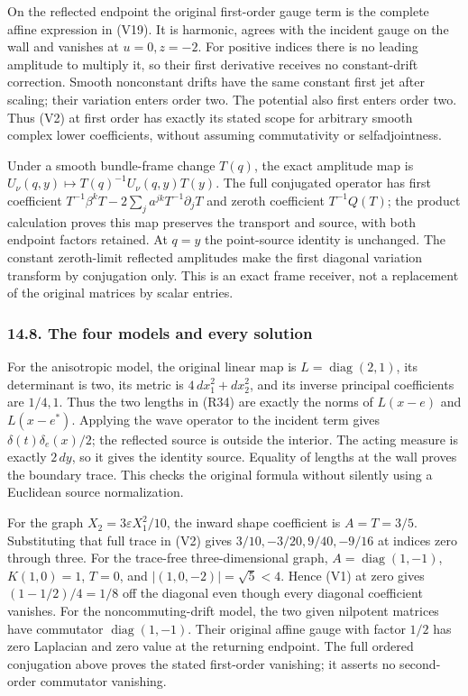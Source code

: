 \documentclass[
  11pt,
]{article}
\begin{document}
On the reflected endpoint the original first-order gauge term is the
complete affine expression in (V19). It is harmonic, agrees with the
incident gauge on the wall and vanishes at \(u=0,z=-2\). For positive
indices there is no leading amplitude to multiply it, so their first
derivative receives no constant-drift correction. Smooth nonconstant
drifts have the same constant first jet after scaling; their variation
enters order two. The potential also first enters order two. Thus (V2)
at first order has exactly its stated scope for arbitrary smooth complex
lower coefficients, without assuming commutativity or selfadjointness.

Under a smooth bundle-frame change \(T(q)\), the exact amplitude map is
\(U_\nu(q,y)\mapsto T(q)^{-1}U_\nu(q,y)T(y)\). The full conjugated
operator has first coefficient
\(T^{-1}\beta^kT-2\sum_j a^{jk}T^{-1}\partial_jT\) and zeroth
coefficient \(T^{-1}Q(T)\); the product calculation proves this map
preserves the transport and source, with both endpoint factors retained.
At \(q=y\) the point-source identity is unchanged. The constant
zeroth-limit reflected amplitudes make the first diagonal variation
transform by conjugation only. This is an exact frame receiver, not a
replacement of the original matrices by scalar entries.

\subsubsection{14.8. The four models and every
solution}\label{the-four-models-and-every-solution}

For the anisotropic model, the original linear map is
\(L=\operatorname{diag}(2,1)\), its determinant is two, its metric is
\(4\,dx_1^2+dx_2^2\), and its inverse principal coefficients are
\(1/4,1\). Thus the two lengths in (R34) are exactly the norms of
\(L(x-e)\) and \(L(x-e^*)\). Applying the wave operator to the incident
term gives \(\delta(t)\delta_e(x)/2\); the reflected source is outside
the interior. The acting measure is exactly \(2\,dy\), so it gives the
identity source. Equality of lengths at the wall proves the boundary
trace. This checks the original formula without silently using a
Euclidean source normalization.

For the graph \(X_2=3\varepsilon X_1^2/10\), the inward shape
coefficient is \(A=T=3/5\). Substituting that full trace in (V2) gives
\(3/10,-3/20,9/40,-9/16\) at indices zero through three. For the
trace-free three-dimensional graph, \(A=\operatorname{diag}(1,-1)\),
\(K(1,0)=1\), \(T=0\), and \(|(1,0,-2)|=\sqrt5<4\). Hence (V1) at zero
gives \((1-1/2)/4=1/8\) off the diagonal even though every diagonal
coefficient vanishes. For the noncommuting-drift model, the two given
nilpotent matrices have commutator \(\operatorname{diag}(1,-1)\). Their
original affine gauge with factor \(1/2\) has zero Laplacian and zero
value at the returning endpoint. The full ordered conjugation above
proves the stated first-order vanishing; it asserts no second-order
commutator vanishing.
\end{document}
